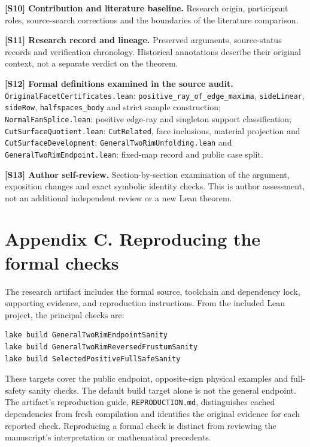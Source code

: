 \documentclass[
  11pt,
  letterpaper,
]{article}
\begin{document}
\textbf{{[}S10{]} Contribution and literature baseline.} Research
origin, participant roles, source-search corrections and the boundaries
of the literature comparison.

\textbf{{[}S11{]} Research record and lineage.} Preserved arguments,
source-status records and verification chronology. Historical
annotations describe their original context, not a separate verdict on
the theorem.

\textbf{{[}S12{]} Formal definitions examined in the source audit.}
\texttt{OriginalFacetCertificates.lean}:
\texttt{positive\_ray\_of\_edge\_maxima}, \texttt{sideLinear},
\texttt{sideRow}, \texttt{halfspaces\_body} and strict sample
construction; \texttt{NormalFanSplice.lean}: positive edge-ray and
singleton support classification; \texttt{CutSurfaceQuotient.lean}:
\texttt{CutRelated}, face inclusions, material projection and
\texttt{CutSurfaceDevelopment}; \texttt{GeneralTwoRimUnfolding.lean} and
\texttt{GeneralTwoRimEndpoint.lean}: fixed-map record and public case
split.

\textbf{{[}S13{]} Author self-review.} Section-by-section examination of
the argument, exposition changes and exact symbolic identity checks.
This is author assessment, not an additional independent review or a new
Lean theorem.

\section{Appendix C. Reproducing the formal
checks}\label{appendix-c.-reproducing-the-formal-checks}

The research artifact includes the formal source, toolchain and
dependency lock, supporting evidence, and reproduction instructions.
From the included Lean project, the principal checks are:

\begin{verbatim}
lake build GeneralTwoRimEndpointSanity
lake build GeneralTwoRimReversedFrustumSanity
lake build SelectedPositiveFullSafeSanity
\end{verbatim}

These targets cover the public endpoint, opposite-sign physical examples
and full-safety sanity checks. The default build target alone is not the
general endpoint. The artifact's reproduction guide,
\texttt{REPRODUCTION.md}, distinguishes cached dependencies from fresh
compilation and identifies the original evidence for each reported
check. Reproducing a formal check is distinct from reviewing the
manuscript's interpretation or mathematical precedents.
\end{document}
